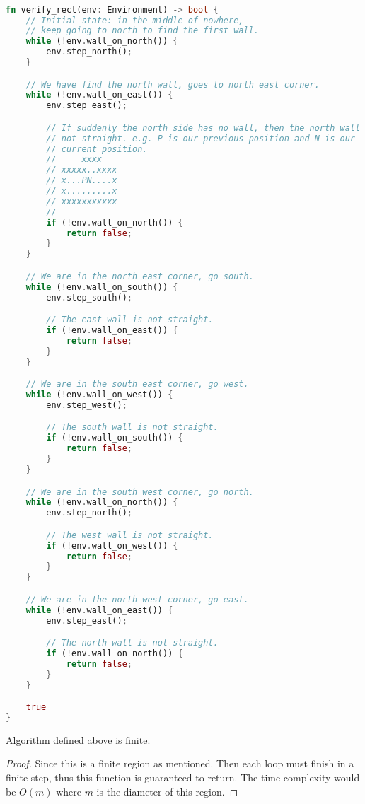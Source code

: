 \begin{lstlisting}[language=Rust, style=boxed]

fn verify_rect(env: Environment) -> bool {
    // Initial state: in the middle of nowhere, 
    // keep going to north to find the first wall.
    while (!env.wall_on_north()) {
        env.step_north();
    }

    // We have find the north wall, goes to north east corner.
    while (!env.wall_on_east()) {
        env.step_east();

        // If suddenly the north side has no wall, then the north wall is  
        // not straight. e.g. P is our previous position and N is our 
        // current position.
        //     xxxx
        // xxxxx..xxxx
        // x...PN....x
        // x.........x
        // xxxxxxxxxxx
        //
        if (!env.wall_on_north()) {
            return false;
        }
    }

    // We are in the north east corner, go south.
    while (!env.wall_on_south()) {
        env.step_south();

        // The east wall is not straight.
        if (!env.wall_on_east()) {
            return false;
        }
    }

    // We are in the south east corner, go west.
    while (!env.wall_on_west()) {
        env.step_west();

        // The south wall is not straight.
        if (!env.wall_on_south()) {
            return false;
        }
    }

    // We are in the south west corner, go north.
    while (!env.wall_on_north()) {
        env.step_north();

        // The west wall is not straight.
        if (!env.wall_on_west()) {
            return false;
        }
    }

    // We are in the north west corner, go east.
    while (!env.wall_on_east()) {
        env.step_east();

        // The north wall is not straight.
        if (!env.wall_on_north()) {
            return false;
        }
    }

    true
}
\end{lstlisting}

\begin{theorem}
    Algorithm defined above is finite.
\end{theorem}

\begin{proof}
    Since this is a finite region as mentioned. 
    Then each loop must finish in a finite step, thus this function is guaranteed to return.
    The time complexity would be $O(m)$ where $m$ is the diameter of this region.
\end{proof}


